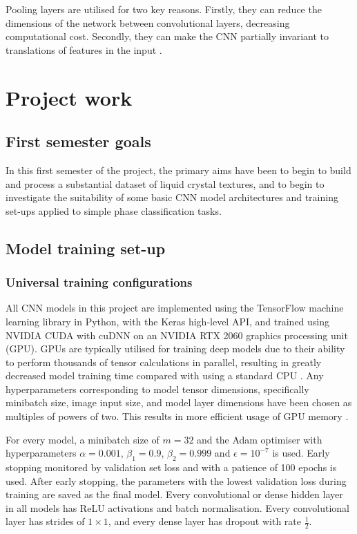 \documentclass[12pt]{article}
\begin{document}
Pooling layers are utilised for two key reasons. Firstly, they can reduce the dimensions of the network between convolutional layers, decreasing computational cost. Secondly, they can make the CNN partially invariant to translations of features in the input \cite{Aghdam17, Goodfellow16}.
\section{Project work}
\subsection{First semester goals}
In this first semester of the project, the primary aims have been to begin to build and process a substantial dataset of liquid crystal textures, and to begin to investigate the suitability of some basic CNN model architectures and training set-ups applied to simple phase classification tasks. 
\subsection{Model training set-up}
\subsubsection{Universal training configurations}
All CNN models in this project are implemented using the TensorFlow machine learning library in Python, with the Keras high-level API, and trained using NVIDIA CUDA with cuDNN on an NVIDIA RTX 2060 graphics processing unit (GPU). GPUs are typically utilised for training deep models due to their ability to perform thousands of tensor calculations in parallel, resulting in greatly decreased model training time compared with using a standard CPU \cite{Shi16, Goodfellow16}. Any hyperparameters corresponding to model tensor dimensions, specifically minibatch size, image input size, and model layer dimensions have been chosen as multiples of powers of two. This results in more efficient usage of GPU memory \cite{Goodfellow16}. 

For every model, a minibatch size of $m=32$ and the Adam optimiser with hyperparameters $\alpha=0.001$, $\beta_1=0.9$, $\beta_2=0.999$ and $\epsilon=10^{-7}$ is used. Early stopping  monitored by validation set loss and with a patience of 100 epochs is used. After early stopping, the parameters with the lowest validation loss during training are saved as the final model. Every convolutional or dense hidden layer in all models has ReLU activations and batch normalisation. Every convolutional layer has strides of $1 \times 1$, and every dense layer has dropout with rate $\frac{1}{2}$.
\end{document}
